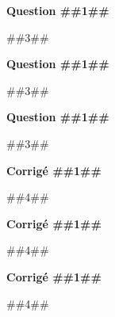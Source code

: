 \documentclass[11pt]{article}
\begin{document}



\begin{minipage}{\linewidth}

\raggedcolumns
\setlength{\columnseprule}{0.5pt}
\begin{multicols}{3}

\textbf{Question ##{{1}}##} \par
##{{3}}##

\columnbreak

\textbf{Question ##{{1}}##} \par
##{{3}}##

\columnbreak

\textbf{Question ##{{1}}##} \par
##{{3}}##

\end{multicols}
\end{minipage}




\begin{minipage}{\linewidth}

\raggedcolumns
\setlength{\columnseprule}{0.5pt}
\begin{multicols}{3}

\textbf{Corrigé ##{{1}}##} \par
##{{4}}##

\columnbreak

\textbf{Corrigé ##{{1}}##} \par
##{{4}}##

\columnbreak

\textbf{Corrigé ##{{1}}##} \par
##{{4}}##

\end{multicols}
\end{minipage}



\end{document}
